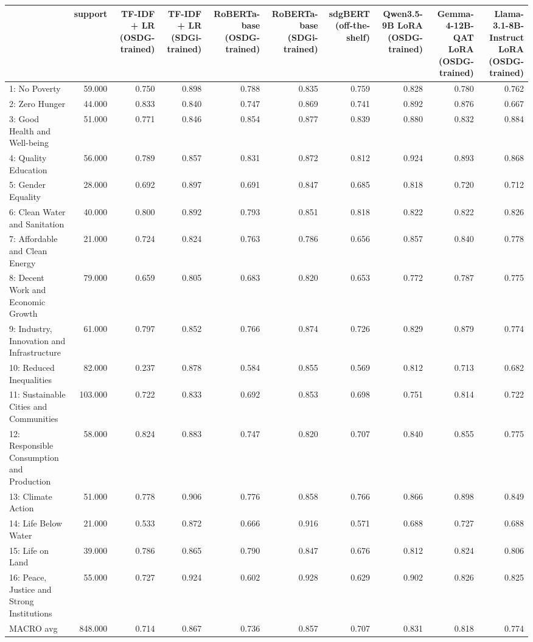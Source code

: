 \begin{tabular}{lrrrrrrrrr}
\toprule
 & support & TF-IDF + LR (OSDG-trained) & TF-IDF + LR (SDGi-trained) & RoBERTa-base (OSDG-trained) & RoBERTa-base (SDGi-trained) & sdgBERT (off-the-shelf) & Qwen3.5-9B LoRA (OSDG-trained) & Gemma-4-12B-QAT LoRA (OSDG-trained) & Llama-3.1-8B-Instruct LoRA (OSDG-trained) \\
\midrule
1: No Poverty & 59.000 & 0.750 & 0.898 & 0.788 & 0.835 & 0.759 & 0.828 & 0.780 & 0.762 \\
2: Zero Hunger & 44.000 & 0.833 & 0.840 & 0.747 & 0.869 & 0.741 & 0.892 & 0.876 & 0.667 \\
3: Good Health and Well-being & 51.000 & 0.771 & 0.846 & 0.854 & 0.877 & 0.839 & 0.880 & 0.832 & 0.884 \\
4: Quality Education & 56.000 & 0.789 & 0.857 & 0.831 & 0.872 & 0.812 & 0.924 & 0.893 & 0.868 \\
5: Gender Equality & 28.000 & 0.692 & 0.897 & 0.691 & 0.847 & 0.685 & 0.818 & 0.720 & 0.712 \\
6: Clean Water and Sanitation & 40.000 & 0.800 & 0.892 & 0.793 & 0.851 & 0.818 & 0.822 & 0.822 & 0.826 \\
7: Affordable and Clean Energy & 21.000 & 0.724 & 0.824 & 0.763 & 0.786 & 0.656 & 0.857 & 0.840 & 0.778 \\
8: Decent Work and Economic Growth & 79.000 & 0.659 & 0.805 & 0.683 & 0.820 & 0.653 & 0.772 & 0.787 & 0.775 \\
9: Industry, Innovation and Infrastructure & 61.000 & 0.797 & 0.852 & 0.766 & 0.874 & 0.726 & 0.829 & 0.879 & 0.774 \\
10: Reduced Inequalities & 82.000 & 0.237 & 0.878 & 0.584 & 0.855 & 0.569 & 0.812 & 0.713 & 0.682 \\
11: Sustainable Cities and Communities & 103.000 & 0.722 & 0.833 & 0.692 & 0.853 & 0.698 & 0.751 & 0.814 & 0.722 \\
12: Responsible Consumption and Production & 58.000 & 0.824 & 0.883 & 0.747 & 0.820 & 0.707 & 0.840 & 0.855 & 0.775 \\
13: Climate Action & 51.000 & 0.778 & 0.906 & 0.776 & 0.858 & 0.766 & 0.866 & 0.898 & 0.849 \\
14: Life Below Water & 21.000 & 0.533 & 0.872 & 0.666 & 0.916 & 0.571 & 0.688 & 0.727 & 0.688 \\
15: Life on Land & 39.000 & 0.786 & 0.865 & 0.790 & 0.847 & 0.676 & 0.812 & 0.824 & 0.806 \\
16: Peace, Justice and Strong Institutions & 55.000 & 0.727 & 0.924 & 0.602 & 0.928 & 0.629 & 0.902 & 0.826 & 0.825 \\
MACRO avg & 848.000 & 0.714 & 0.867 & 0.736 & 0.857 & 0.707 & 0.831 & 0.818 & 0.774 \\
\bottomrule
\end{tabular}
